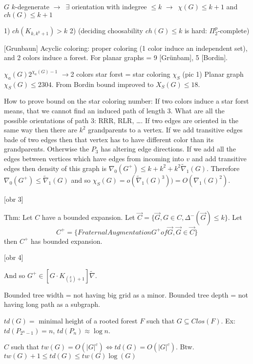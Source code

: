 
\def\arr{$\rightarrow$}
\def\tilde{\widetilde}
\def\RA{\Rightarrow}


$G$ $k$-degenerate \arr\ $\exists$ orientation with indegree $\leq k$ \arr\ $\chi(G) \leq k+1$ and $ch(G) \leq k+1$

1) $ch(K_{k,k^k+1})>k$
2) (deciding choosability  $ch(G) \leq k$ is hard: $\Pi_2^p$-complete)


[Grunbaun] Acyclic coloring: proper coloring (1 color induce an independent set), and 2 colors induce a forest.
For planar graphs = 9 [Grünbam], 5 [Bordin].

$\chi_a(G) 2^{\chi_a(G)-1}$ \arr 2 colors star forst = star coloring $\chi_S$
(pic 1)
Planar graph $\chi_S(G) \leq 2304$.
From Bordin bound improved to $X_S(G) \leq 18$.

\def\no{\nabla_0}

How to prove bound on the star coloring number:
If two colors induce a star forst means, that we cannot find an induced path of length $3$.
What are all the possible orientations of path $3$: RRR, RLR, \dots.
If two edges are oriented in the same way then there are $k^2$ grandparents to a vertex.
If we add transitive edges bade of two edges then that vertex has to have different color than its grandparents.
Otherwise the $P_3$ has altering edge directions.
If we add all the edges between vertices which have edges from incoming into $v$ and add transitive edges then density of this graph is $\no(G^+) \leq k+k^2+k^2\tilde\nabla_1(G)$.
Therefore $\no(G^+) \leq \tilde\nabla_1(G)$ and so $\chi_S(G) = o(\tilde\nabla_1(G)^3)) = O(\nabla_1(G)^2)$.

[obr 3]

\def\oa{\overrightarrow}
Thm: Let $C$ have a bounded expansion. Let $\oa{C} = \{\oa{G},G \in C, \Delta^-(\oa{G}) \leq k\}$.
Let $$C^+ = \{ { Fraternal Augmentation } G^+ of \oa{G},\oa{G} \in \oa{C}\}$$
then $C^+$ has bounded expansion.

[obr 4]

And so $G^+ \in [G\cdot K_{{k \choose 2}+1}]\tilde\nabla$.

Bounded tree width = not having big grid as a minor.
Bounded tree depth = not having long path as a subgraph.

$td(G) =$ minimal height of a rooted forest $F$ such that $G \subseteq Clos(F)$.
Ex: $td(P_{2^n-1}) = n$, $td(P_n) \approx \log n$.

\def\LRA{\Leftrightarrow}

$C$ such that $tw(G) = O(|G|^c) \LRA td(G) = O(|G|^c)$.
Btw. $tw(G) + 1\leq td(G) \leq tw(G)\log(G)$

